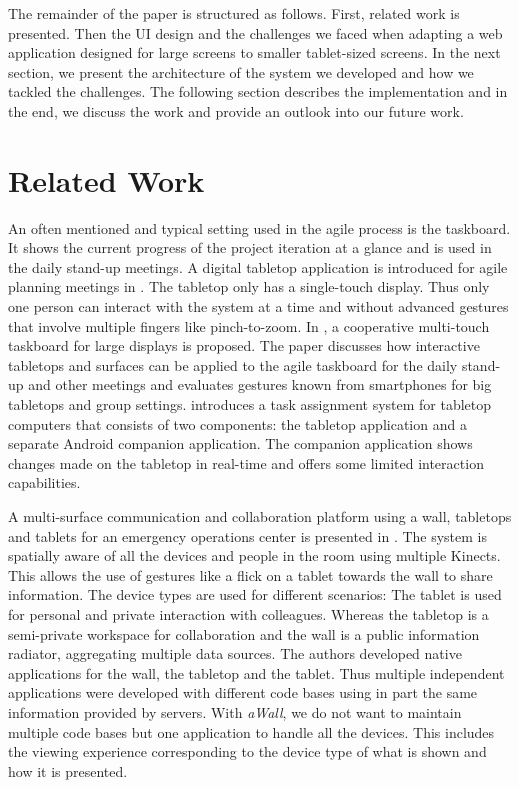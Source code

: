 \documentclass{sigchi}
\begin{document}
The remainder of the paper is structured as follows.
First, related work is presented.
Then the UI design and the challenges we faced when adapting a web application designed for large screens to smaller tablet-sized screens.
In the next section, we present the architecture of the system we developed and how we tackled the challenges.
The following section describes the implementation and in the end, we discuss the work and provide an outlook into our future work.

\section{Related Work}
An often mentioned and typical setting used in the agile process is the taskboard.
It shows the current progress of the project iteration at a glance and is used in the daily stand-up meetings. 
A digital tabletop application is introduced for agile planning meetings in \cite{Ghanam:4599452}. 
The tabletop only has a single-touch display. 
Thus only one person can interact with the system at a time and without advanced gestures that involve multiple fingers like pinch-to-zoom.
In \cite{Rubart:2014:CMS:2669485.2669551}, a cooperative multi-touch taskboard for large displays is proposed. 
The paper discusses how interactive tabletops and surfaces can be applied to the agile taskboard for the daily stand-up and other meetings and evaluates gestures known from smartphones for big tabletops and group settings.
\cite{Haas:2014:TAV:2669485.2669538} introduces a task assignment system for tabletop computers that consists of two components: the tabletop application and a separate Android companion application.
The companion application shows changes made on the tabletop in real-time and offers some limited interaction capabilities.

A multi-surface communication and collaboration platform using a wall, tabletops and tablets for an emergency operations center is presented in \cite{Chokshi:2014:EMM:2669485.2669520}. 
The system is spatially aware of all the devices and people in the room using multiple Kinects.
This allows the use of gestures like a flick on a tablet towards the wall to share information.
The device types are used for different scenarios:
The tablet is used for personal and private interaction with colleagues.
Whereas the tabletop is a semi-private workspace for collaboration and the wall is a public information radiator, aggregating multiple data sources.
The authors developed native applications for the wall, the tabletop and the tablet.
Thus multiple independent applications were developed with different code bases using in part the same information provided by servers.
With \textit{aWall}, we do not want to maintain multiple code bases but one application to handle all the devices.
This includes the viewing experience corresponding to the device type of what is shown and how it is presented.
\end{document}
